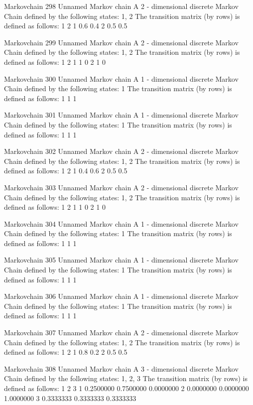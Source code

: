 \documentclass[
  nojss]{jss}
\begin{document}
\begin{CodeChunk}
\begin{CodeOutput}
Markovchain  298 
Unnamed Markov chain 
 A  2 - dimensional discrete Markov Chain defined by the following states: 
 1, 2 
 The transition matrix  (by rows)  is defined as follows: 
    1   2
1 0.6 0.4
2 0.5 0.5

Markovchain  299 
Unnamed Markov chain 
 A  2 - dimensional discrete Markov Chain defined by the following states: 
 1, 2 
 The transition matrix  (by rows)  is defined as follows: 
  1 2
1 1 0
2 1 0

Markovchain  300 
Unnamed Markov chain 
 A  1 - dimensional discrete Markov Chain defined by the following states: 
 1 
 The transition matrix  (by rows)  is defined as follows: 
  1
1 1

Markovchain  301 
Unnamed Markov chain 
 A  1 - dimensional discrete Markov Chain defined by the following states: 
 1 
 The transition matrix  (by rows)  is defined as follows: 
  1
1 1

Markovchain  302 
Unnamed Markov chain 
 A  2 - dimensional discrete Markov Chain defined by the following states: 
 1, 2 
 The transition matrix  (by rows)  is defined as follows: 
    1   2
1 0.4 0.6
2 0.5 0.5

Markovchain  303 
Unnamed Markov chain 
 A  2 - dimensional discrete Markov Chain defined by the following states: 
 1, 2 
 The transition matrix  (by rows)  is defined as follows: 
  1 2
1 1 0
2 1 0

Markovchain  304 
Unnamed Markov chain 
 A  1 - dimensional discrete Markov Chain defined by the following states: 
 1 
 The transition matrix  (by rows)  is defined as follows: 
  1
1 1

Markovchain  305 
Unnamed Markov chain 
 A  1 - dimensional discrete Markov Chain defined by the following states: 
 1 
 The transition matrix  (by rows)  is defined as follows: 
  1
1 1

Markovchain  306 
Unnamed Markov chain 
 A  1 - dimensional discrete Markov Chain defined by the following states: 
 1 
 The transition matrix  (by rows)  is defined as follows: 
  1
1 1

Markovchain  307 
Unnamed Markov chain 
 A  2 - dimensional discrete Markov Chain defined by the following states: 
 1, 2 
 The transition matrix  (by rows)  is defined as follows: 
    1   2
1 0.8 0.2
2 0.5 0.5

Markovchain  308 
Unnamed Markov chain 
 A  3 - dimensional discrete Markov Chain defined by the following states: 
 1, 2, 3 
 The transition matrix  (by rows)  is defined as follows: 
          1         2         3
1 0.2500000 0.7500000 0.0000000
2 0.0000000 0.0000000 1.0000000
3 0.3333333 0.3333333 0.3333333


\end{CodeOutput}
\end{CodeChunk}
\end{document}
